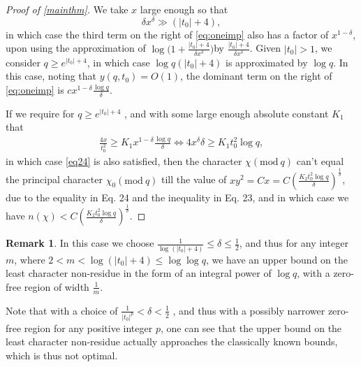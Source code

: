 \documentclass[letter,12pt]{article}
\newcounter{rmk}
\theoremstyle{plain}
\theoremstyle{definition}
\newtheorem{remark}[rmk]{Remark}
\theoremstyle{plain}
\begin{document}
\begin{proof}[Proof of \cref{mainthm}]
We take $x$ large enough so that
\begin{equation}\label{eq24}
\delta x^{\delta}\gg (|t_0|+4),
\end{equation}
in which case the third term on the right of \cref{eq:oneimp} also has a factor of $x^{1-\delta}$, upon using the approximation of $\log\big(1+ \frac{|t_0|+4}{\delta x^{\delta}}\big)$by $ \frac{|t_0|+4}{\delta x^{\delta}} $. Given $|t_0|>1$, we consider $q\geq e^{|t_0|+4}$, in which case $\log q(|t_0|+4)$ is approximated by $ \log q$. In this case, noting that $y(q,t_0)=O(1)$, the dominant term on the right of \cref{eq:oneimp} is $c x^{1-\delta}\frac{\log q}{\delta}$.

If we require for $q\geq e^{|t_0|+4}$ , and with some large enough absolute constant $K_1$ that
\begin{align}
    \frac{4x}{t_{0}^{2}}\geq K_1 x^{1-\delta}\frac{\log q}{\delta}\Leftrightarrow 4x^{\delta}\delta \geq K_1 t_{0}^{2}\log q,
\end{align}
in which case \cref{eq24} is also satisfied, then the character $\chi(\text{mod} \ q)$ can't equal the principal character $\chi_0(\text{mod} \ q)$ till the value of $xy^{2}=Cx=C(\frac{K_2 t_{0}^{2}\log q}{\delta})^{\frac{1}{\delta}}$, due to the equality in Eq. 24 and the inequality in Eq. 23, and in which case we have $n(\chi)<C(\frac{K_2 t_{0}^{2}\log q}{\delta})^{\frac{1}{\delta}}$.
\end{proof}
\begin{remark}In this case we choose $\frac{1}{\log (|t_0|+4)}\leq \delta\leq \frac{1}{2}$, and thus for any integer $m$, where $2<m<\log (|t_0|+4)\leq \log \log q$, we have an upper bound on the least character non-residue in the form of an integral power of $\log q$, with a zero-free region of width $\frac{1}{m}$. 

Note that with a choice of $\frac{1}{|t_0|^{p}}<\delta<\frac{1}{2}$ , and thus with a possibly narrower zero-free region for any positive integer $p$, one can see that the upper bound on the least character non-residue actually approaches the classically known bounds, which is thus not optimal.
\end{remark}


\end{document}
